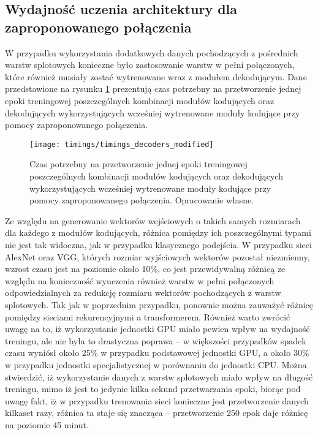 \subsection{Wydajność uczenia architektury dla zaproponowanego połączenia}
W przypadku wykorzystania dodatkowych danych pochodzących z pośrednich warstw splotowych konieczne było zastosowanie warstw w pełni połączonych, które również musiały zostać wytrenowane wraz z modułem dekodującym. Dane przedstawione na rysunku \ref{fig:timings-decoders-modified} prezentują czas potrzebny na przetworzenie jednej epoki treningowej poszczególnych kombinacji modułów kodujących oraz dekodujących wykorzystujących wcześniej wytrenowane moduły kodujące przy pomocy zaproponowanego połączenia.
\begin{figure}[H]
    \centering
    \texttt{[image: timings/timings\_decoders\_modified]}
    \caption{Czas potrzebny na przetworzenie jednej epoki treningowej poszczególnych kombinacji modułów kodujących oraz dekodujących wykorzystujących wcześniej wytrenowane moduły kodujące przy pomocy zaproponowanego połączenia. Opracowanie własne.}
    \label{fig:timings-decoders-modified}
\end{figure}
\noindent Ze względu na generowanie wektorów wejściowych o takich samych rozmiarach dla każdego z modułów kodujących, różnica pomiędzy ich poszczególnymi typami nie jest tak widoczna, jak w przypadku klasycznego podejścia. W przypadku sieci AlexNet oraz VGG, których rozmiar wyjściowych wektorów pozostał niezmienny, wzrost czasu jest na poziomie około 10\%, co jest przewidywalną różnicą ze względu na konieczność wyuczenia również warstw w pełni połączonych odpowiedzialnych za redukcję rozmiaru wektorów pochodzących z warstw splotowych. Tak jak w poprzednim przypadku, ponownie można zauważyć różnicę pomiędzy sieciami rekurencyjnymi a transformerem. Również warto zwrócić uwagę na to, iż wykorzystanie jednostki GPU miało pewien wpływ na wydajność treningu, ale nie była to drastyczna poprawa -- w większości przypadków spadek czasu wyniósł około 25\% w przypadku podstawowej jednostki GPU, a około 30\% w przypadku jednostki specjalistycznej w porównaniu do jednostki CPU. Można stwierdzić, iż wykorzystanie danych z warstw splotowych miało wpływ na długość treningu, mimo iż jest to jedynie kilka sekund przetwarzania epoki, biorąc pod uwagę fakt, iż w przypadku trenowania sieci konieczne jest przetworzenie danych kilkaset razy, różnica ta staje się znacząca -- przetworzenie 250 epok daje różnicę na poziomie 45 minut.
